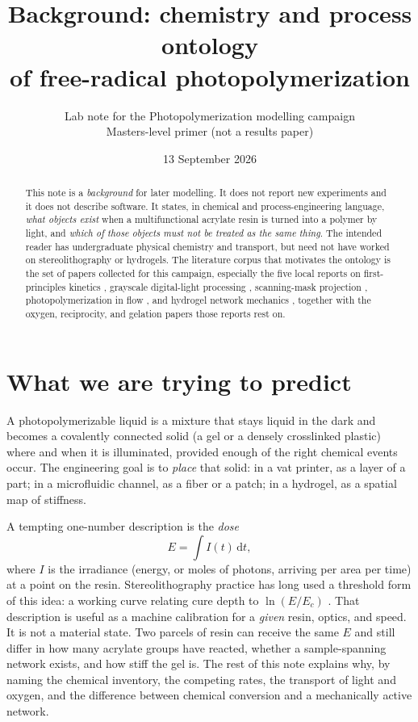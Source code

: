 \documentclass[11pt,a4paper]{article}
\title{Background: chemistry and process ontology\\
of free-radical photopolymerization}
\author{Lab note for the Photopolymerization modelling campaign\\
\small Masters-level primer (not a results paper)}
\date{13 September 2026}
\begin{document}
\maketitle

\begin{abstract}
\noindent
This note is a \emph{background} for later modelling. It does not report new experiments and it does not describe software.
It states, in chemical and process-engineering language, \emph{what objects exist} when a multifunctional acrylate resin is turned into a polymer by light, and \emph{which of those objects must not be treated as the same thing}.
The intended reader has undergraduate physical chemistry and transport, but need not have worked on stereolithography or hydrogels.
The literature corpus that motivates the ontology is the set of papers collected for this campaign, especially the five local reports on first-principles kinetics \citep{Dobson2024}, grayscale digital-light processing \citep{Montgomery2022}, scanning-mask projection \citep{Meenakshisundaram2020}, photopolymerization in flow \citep{Slutzky2019}, and hydrogel network mechanics \citep{Zhu2020}, together with the oxygen, reciprocity, and gelation papers those reports rest on.
\end{abstract}

\tableofcontents
\vspace{1em}

\section{What we are trying to predict}

A photopolymerizable liquid is a mixture that stays liquid in the dark and becomes a covalently connected solid (a gel or a densely crosslinked plastic) where and when it is illuminated, provided enough of the right chemical events occur.
The engineering goal is to \emph{place} that solid: in a vat printer, as a layer of a part; in a microfluidic channel, as a fiber or a patch; in a hydrogel, as a spatial map of stiffness.

A tempting one-number description is the \emph{dose}
\begin{equation}
  E = \int I(t)\,\mathrm{d}t,
  \label{eq:dose}
\end{equation}
where $I$ is the irradiance (energy, or moles of photons, arriving per area per time) at a point on the resin.
Stereolithography practice has long used a threshold form of this idea: a working curve relating cure depth to $\ln(E/E_c)$ \citep{Jacobs1992book}.
That description is useful as a machine calibration for a \emph{given} resin, optics, and speed.
It is not a material state.
Two parcels of resin can receive the same $E$ and still differ in how many acrylate groups have reacted, whether a sample-spanning network exists, and how stiff the gel is.
The rest of this note explains why, by naming the chemical inventory, the competing rates, the transport of light and oxygen, and the difference between chemical conversion and a mechanically active network.
\end{document}
